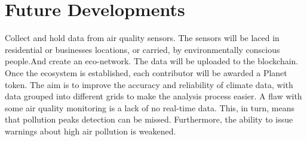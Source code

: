 \section{Future Developments}
Collect and hold data from air quality sensors. The sensors will be laced in residential or businesses locations, or carried, by environmentally conscious people.And create an eco-network. The data will be uploaded to the blockchain. Once the ecosystem is established, each contributor will be awarded a Planet token. The aim is to improve the accuracy and reliability of climate data, with data grouped into different grids to make the analysis process easier. A flaw with some air quality monitoring is a lack of no real-time data. This, in turn, means that pollution peaks detection can be missed. Furthermore, the ability to issue warnings about high air pollution is weakened.




